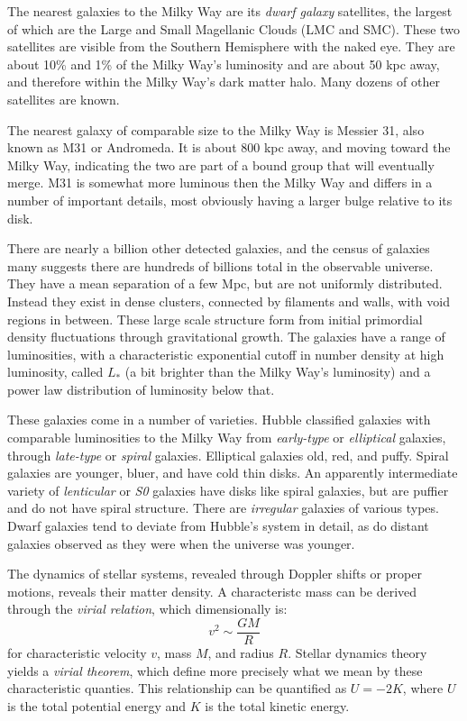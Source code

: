The nearest galaxies to the Milky Way are its {\it dwarf galaxy}
satellites, the largest of which are the Large and Small Magellanic
Clouds (LMC and SMC). These two satellites are visible from the
Southern Hemisphere with the naked eye. They are about 10\% and 1\% of
the Milky Way's luminosity and are about 50 kpc away, and therefore
within the Milky Way's dark matter halo. Many dozens of other
satellites are known.

The nearest galaxy of comparable size to the Milky Way is Messier 31,
also known as M31 or Andromeda. It is about 800 kpc away, and moving
toward the Milky Way, indicating the two are part of a bound group
that will eventually merge. M31 is somewhat more luminous then the
Milky Way and differs in a number of important details, most obviously
having a larger bulge relative to its disk.

There are nearly a billion other detected galaxies, and the census of
galaxies many suggests there are hundreds of billions total in the
observable universe. They have a mean separation of a few Mpc, but are
not uniformly distributed. Instead they exist in dense clusters,
connected by filaments and walls, with void regions in between. These
large scale structure form from initial primordial density
fluctuations through gravitational growth. The galaxies have a range
of luminosities, with a characteristic exponential cutoff in number
density at high luminosity, called $L_\ast$ (a bit brighter than the
Milky Way's luminosity) and a power law distribution of luminosity
below that.

These galaxies come in a number of varieties. Hubble classified
galaxies with comparable luminosities to the Milky Way from {\it
  early-type} or {\it elliptical} galaxies, through {\it late-type} or
{\it spiral} galaxies.  Elliptical galaxies old, red, and
puffy. Spiral galaxies are younger, bluer, and have cold thin
disks. An apparently intermediate variety of {\it lenticular} or {\it
  S0} galaxies have disks like spiral galaxies, but are puffier and do
not have spiral structure. There are {\it irregular} galaxies of
various types. Dwarf galaxies tend to deviate from Hubble's system in
detail, as do distant galaxies observed as they were when the universe
was younger.

The dynamics of stellar systems, revealed through Doppler shifts or
proper motions, reveals their matter density. A characteristc mass can
be derived through the {\it virial relation}, which dimensionally is:
\begin{equation}
v^2 \sim \frac{GM}{R}
\end{equation}
for characteristic velocity $v$, mass $M$, and radius $R$. Stellar
dynamics theory yields a {\it virial theorem}, which define more
precisely what we mean by these characteristic quanties. This
relationship can be quantified as $U = -2 K$, where $U$ is the total
potential energy and $K$ is the total kinetic energy.

